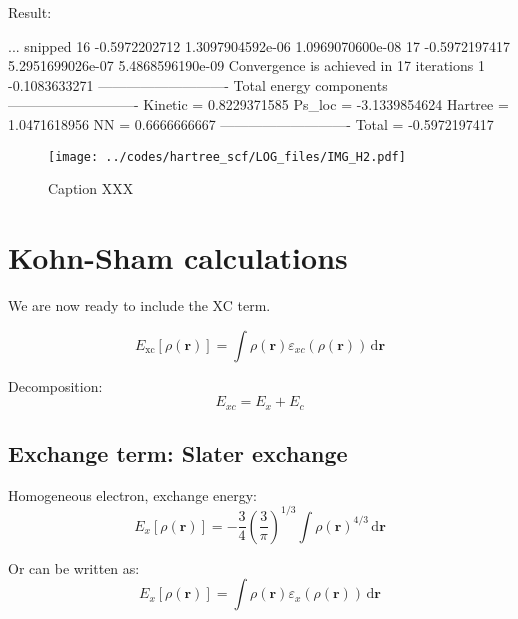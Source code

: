 Result:
\begin{textcode}
... snipped
16      -0.5972202712   1.3097904592e-06   1.0969070600e-08
17      -0.5972197417   5.2951699026e-07   5.4868596190e-09
Convergence is achieved in 17 iterations
1      -0.1083633271
----------------------------
Total energy components
----------------------------
Kinetic =       0.8229371585
Ps_loc  =      -3.1339854624
Hartree =       1.0471618956
NN      =       0.6666666667
----------------------------
Total   =      -0.5972197417
\end{textcode}

\begin{figure}[h]
\begin{center}
\texttt{[image: ../codes/hartree\_scf/LOG\_files/IMG\_H2.pdf]}
\end{center}
\caption{Caption XXX}
\end{figure}




\section{Kohn-Sham calculations}

We are now ready to include the XC term.

\begin{equation}
E_{\mathrm{xc}}[\rho(\mathbf{r})] = \int \rho(\mathbf{r})
\varepsilon_{xc}(\rho(\mathbf{r}))\,\mathrm{d}\mathbf{r}
\end{equation}

Decomposition:
\begin{equation}
E_{xc} = E_{x} + E_{c}
\end{equation}

\subsection{Exchange term: Slater exchange}

Homogeneous electron, exchange energy:
\begin{equation}
E_{x}[\rho(\mathbf{r})] = -\frac{3}{4} \left(\frac{3}{\pi}\right)^{1/3}
\int \rho(\mathbf{r})^{4/3}\,\mathrm{d}\mathbf{r}
\end{equation}

Or can be written as:
\begin{equation}
E_{x}[\rho(\mathbf{r})] = \int \rho(\mathbf{r}) \varepsilon_{x}(\rho(\mathbf{r}))\,\mathrm{d}\mathbf{r}
\end{equation}

